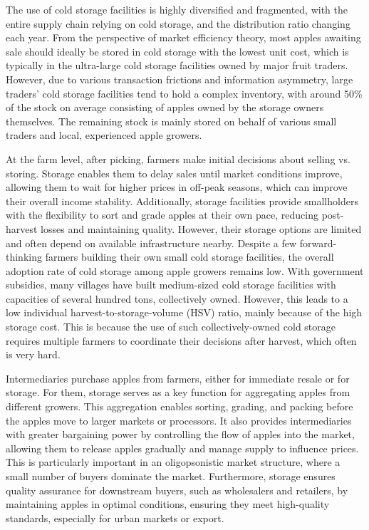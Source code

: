 The use of cold storage facilities is highly diversified and fragmented, with the entire supply chain relying on cold storage, and the distribution ratio changing each year. From the perspective of market efficiency theory, most apples awaiting sale should ideally be stored in cold storage with the lowest unit cost, which is typically in the ultra-large cold storage facilities owned by major fruit traders. However, due to various transaction frictions and information asymmetry, large traders' cold storage facilities tend to hold a complex inventory, with around 50\% of the stock on average consisting of apples owned by the storage owners themselves. The remaining stock is mainly stored on behalf of various small traders and local, experienced apple growers.

At the farm level, after picking, farmers make initial decisions about selling vs. storing. Storage enables them to delay sales until market conditions improve, allowing them to wait for higher prices in off-peak seasons, which can improve their overall income stability. Additionally, storage facilities provide smallholders with the flexibility to sort and grade apples at their own pace, reducing post-harvest losses and maintaining quality. However, their storage options are limited and often depend on available infrastructure nearby. Despite a few forward-thinking farmers building their own small cold storage facilities, the overall adoption rate of cold storage among apple growers remains low. With government subsidies, many villages have built medium-sized cold storage facilities with capacities of several hundred tons, collectively owned. However, this leads to a low individual harvest-to-storage-volume (HSV) ratio, mainly because of the high storage cost. This is because the use of such collectively-owned cold storage requires multiple farmers to coordinate their decisions after harvest, which often is very hard.

Intermediaries purchase apples from farmers, either for immediate resale or for storage. For them, storage serves as a key function for aggregating apples from different growers. This aggregation enables sorting, grading, and packing before the apples move to larger markets or processors. It also provides intermediaries with greater bargaining power by controlling the flow of apples into the market, allowing them to release apples gradually and manage supply to influence prices. This is particularly important in an oligopsonistic market structure, where a small number of buyers dominate the market. Furthermore, storage ensures quality assurance for downstream buyers, such as wholesalers and retailers, by maintaining apples in optimal conditions, ensuring they meet high-quality standards, especially for urban markets or export.


